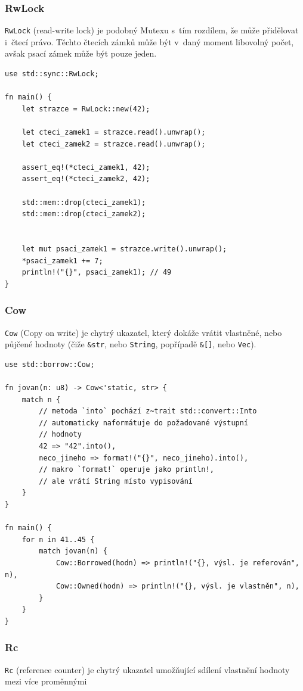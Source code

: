 \documentclass[a4paper, 12pt, twoside]{article} %
\newcommand{\rust}[1]{\texttt{#1}}
\begin{document}
			\subsubsection*{RwLock}
				\rust{RwLock} (read-write lock) je podobný Mutexu s~tím rozdílem, že může přidělovat i~čtecí právo. Těchto čtecích zámků může být v~daný moment libovolný počet, avšak psací zámek může být pouze jeden.
				\begin{verbatim}
use std::sync::RwLock;

fn main() {
	let strazce = RwLock::new(42);

	let cteci_zamek1 = strazce.read().unwrap();
	let cteci_zamek2 = strazce.read().unwrap();

	assert_eq!(*cteci_zamek1, 42);
	assert_eq!(*cteci_zamek2, 42);

	std::mem::drop(cteci_zamek1);
	std::mem::drop(cteci_zamek2);


	let mut psaci_zamek1 = strazce.write().unwrap();
	*psaci_zamek1 += 7;
	println!("{}", psaci_zamek1); // 49
}
				\end{verbatim}
				
			\subsubsection*{Cow}
				\rust{Cow} (Copy on write) je chytrý ukazatel, který dokáže vrátit vlastněné, nebo půjčené hodnoty (čiže \rust{&str}, nebo \rust{String}, popřípadě \rust{&[]}, nebo \rust{Vec}).
				\begin{verbatim}
use std::borrow::Cow;

fn jovan(n: u8) -> Cow<'static, str> {
	match n {
		// metoda `into` pochází z~trait std::convert::Into
		// automaticky naformátuje do požadované výstupní
		// hodnoty
		42 => "42".into(),
		neco_jineho => format!("{}", neco_jineho).into(),
		// makro `format!` operuje jako println!,
		// ale vrátí String místo vypisování
	}
}

fn main() {
	for n in 41..45 {
		match jovan(n) {
			Cow::Borrowed(hodn) => println!("{}, výsl. je referován", n),
			Cow::Owned(hodn) => println!("{}, výsl. je vlastněn", n),
		}
	}
}
				\end{verbatim}
				\cite{cow}


			\subsubsection*{Rc}
				\rust{Rc} (reference counter) je chytrý ukazatel umožňující sdílení vlastnění hodnoty mezi více proměnnými
			
\end{document}
